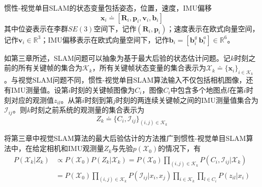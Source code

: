 惯性-视觉单目SLAM的状态变量包括姿态，位置，速度，IMU偏移
\begin{equation}
\label{equ5.1}
\boldsymbol{x}_i \doteq \left[ \boldsymbol{R}_i,\boldsymbol{p}_i,\boldsymbol{v}_i,\boldsymbol{b}_i \right]
\end{equation}
其中位姿表示在李群$SE(3)$空间下，记作$\left( \boldsymbol{R}_i, \boldsymbol{p}_i \right)$；速度表示在欧式向量空间，记作$\boldsymbol{v}_i \in \mathds{R}^3 $；IMU偏移表示在欧式向量空间下，记作$\boldsymbol{b}_i=[\boldsymbol{b}_i^g \ \boldsymbol{b}_i^a] \in \mathds{R}^6$。

如第三章所述，SLAM问题可以抽象为基于最大后验的状态估计问题。记$k$时刻之前的所有关键帧的集合为$\mathcal{K}_k$，所有关键帧状态变量的集合表示为$\mathcal{X}_k \doteq \{\boldsymbol{x}_i\}_{i \in \mathcal{K}_k}$。与视觉SLAM问题不同，惯性-视觉单目SLAM算法输入不仅包括相机图像，还有IMU测量值。设第$i$时刻的关键帧图像为$C_i$，图像$C_i$中包含多个地图点$l$在第$i$时刻对应的观测值$z_{il}$。从第$i$时刻到第$j$时刻的两连续关键帧之间的IMU测量值集合为$\mathcal{I}_{ij}$。则$k$时刻之前系统的观测量的集合表示为
\begin{equation}
\label{equ5.2}
Z_k \doteq \{C_i,\mathcal{I}_{ij}\}_{(i,j) \in \mathcal{K}_k}
\end{equation}

将第三章中视觉SLAM算法的最大后验估计的方法推广到惯性-视觉单目SLAM算法中，在给定相机和IMU观测量$Z_k$与先验$p(\mathcal{X}_0)$的情况下，有
\begin{equation}
\label{equ5.3}
\begin{aligned}
P(\mathcal{X}_k | Z_k) & \varpropto P(\mathcal{X}_0)P(Z_k | \mathcal{X}_k) = P(\mathcal{X}_0) \prod\limits_{(i,j) \in \mathcal{K}_k} \! P \left( C_i,\mathcal{I}_{ij} | \mathcal{X}_k \right) \\
&=P(\mathcal{X}_0) \prod\limits_{(i,j) \in \mathcal{K}_k} P \left( \mathcal{I}_{ij} | x_i,x_j \right) \prod\limits_{i \in \mathcal{K}_k} \prod\limits_{l \in C_i}  P \left( z_{il} | x_i \right)
\end{aligned}
\end{equation}

